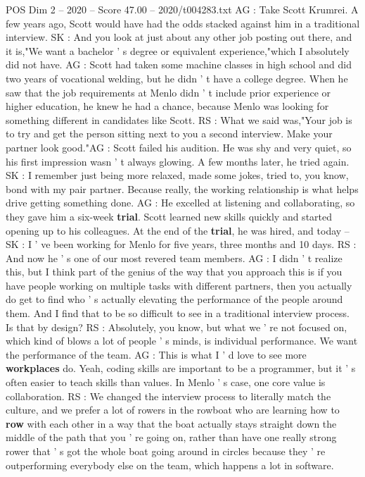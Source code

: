 \begin{textsample}{POS Dim 2 – 2020 – Score 47.00 – 2020/t004283.txt}
AG : Take Scott Krumrei.
A few years ago, Scott would have had the odds stacked against him in a traditional interview.
SK : And you look at just about any other job posting out there, and it is,"We want a bachelor ' s degree or equivalent experience,"which I absolutely did not have.
AG : Scott had taken some machine classes in high school and did two years of vocational welding, but he didn ' t have a college degree.
When he saw that the job requirements at Menlo didn ' t include prior experience or higher education, he knew he had a chance, because Menlo was looking for something different in candidates like Scott.
RS : What we said was,"Your job is to try and get the person sitting next to you a second interview.
Make your partner look good."AG : Scott failed his audition.
He was shy and very quiet, so his first impression wasn ' t always glowing.
A few months later, he tried again.
SK : I remember just being more relaxed, made some jokes, tried to, you know, bond with my pair partner.
Because really, the working relationship is what helps drive getting something done.
AG : He excelled at listening and collaborating, so they gave him a six-week \textbf{trial}.
Scott learned new skills quickly and started opening up to his colleagues.
At the end of the \textbf{trial}, he was hired, and today -- SK : I ' ve been working for Menlo for five years, three months and 10 days.
RS : And now he ' s one of our most revered team members.
AG : I didn ' t realize this, but I think part of the genius of the way that you approach this is if you have people working on multiple tasks with different partners, then you actually do get to find who ' s actually elevating the performance of the people around them.
And I find that to be so difficult to see in a traditional interview process.
Is that by design?
RS : Absolutely, you know, but what we ' re not focused on, which kind of blows a lot of people ' s minds, is individual performance.
We want the performance of the team.
AG : This is what I ' d love to see more \textbf{workplaces} do.
Yeah, coding skills are important to be a programmer, but it ' s often easier to teach skills than values.
In Menlo ' s case, one core value is collaboration.
RS : We changed the interview process to literally match the culture, and we prefer a lot of rowers in the rowboat who are learning how to \textbf{row} with each other in a way that the boat actually stays straight down the middle of the path that you ' re going on, rather than have one really strong rower that ' s got the whole boat going around in circles because they ' re outperforming everybody else on the team, which happens a lot in software.

\end{textsample}
